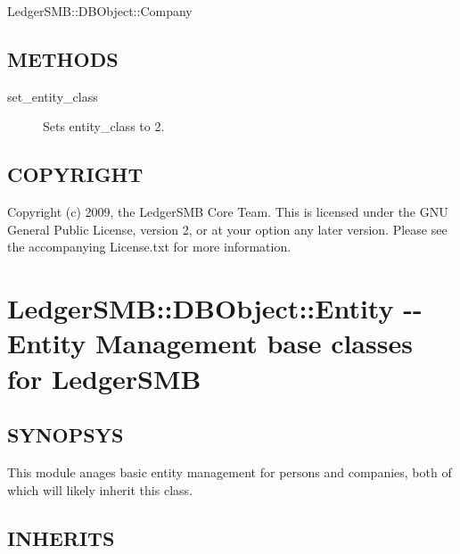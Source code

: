 \begin{description}
\begin{description}
\begin{description}
\begin{description}
\begin{description}
\begin{description}
\begin{description}
\begin{description}
\begin{description}
\begin{description}
LedgerSMB::DBObject::Company

\subsection*{METHODS\label{LedgerSMB::DBObject::Customer_METHODS}}
\begin{description}

\item[{set\_entity\_class}] \mbox{}

Sets entity\_class to 2.

\end{description}
\subsection*{COPYRIGHT\label{LedgerSMB::DBObject::Customer_COPYRIGHT}}


Copyright (c) 2009, the LedgerSMB Core Team.  This is licensed under the GNU 
General Public License, version 2, or at your option any later version.  Please 
see the accompanying License.txt for more information.

\section{LedgerSMB::DBObject::Entity -{}- Entity Management base classes for LedgerSMB\label{LedgerSMB::DBObject::Entity_-_-_Entity_Management_base_classes_for_LedgerSMB}}




\subsection*{SYNOPSYS\label{LedgerSMB::DBObject::Entity_-_-_Entity_Management_base_classes_for_LedgerSMB_SYNOPSYS}}


This module anages basic entity management for persons and companies, both of which will
likely inherit this class.

\subsection*{INHERITS\label{LedgerSMB::DBObject::Entity_-_-_Entity_Management_base_classes_for_LedgerSMB_INHERITS}}
\begin{description}


\end{description}
\end{description}
\end{description}
\end{description}
\end{description}
\end{description}
\end{description}
\end{description}
\end{description}
\end{description}
\end{description}
